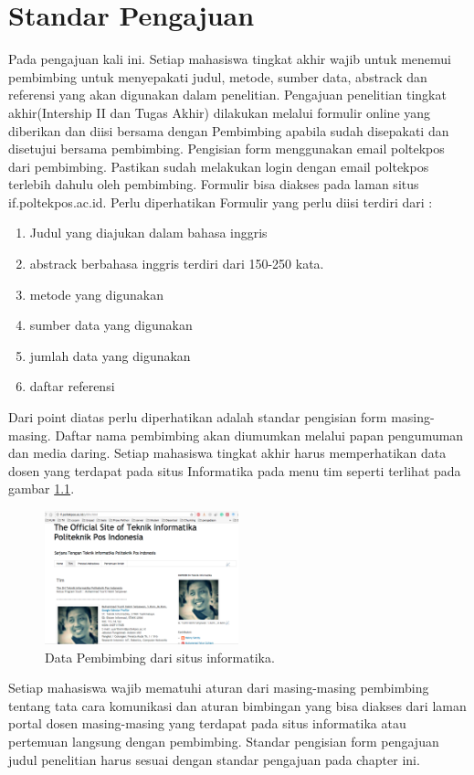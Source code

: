 \chapter{Standar Pengajuan}

Pada pengajuan kali ini. Setiap mahasiswa tingkat akhir wajib untuk menemui pembimbing untuk menyepakati judul, metode, sumber data, abstrack dan referensi yang akan digunakan dalam penelitian. Pengajuan penelitian tingkat akhir(Intership II dan Tugas Akhir) dilakukan melalui formulir online yang diberikan dan diisi bersama dengan Pembimbing apabila sudah disepakati dan disetujui bersama pembimbing. Pengisian form menggunakan email poltekpos dari pembimbing. Pastikan sudah melakukan login dengan email poltekpos terlebih dahulu oleh pembimbing. Formulir bisa diakses pada laman situs if.poltekpos.ac.id. Perlu diperhatikan Formulir yang perlu diisi terdiri dari :
\begin{enumerate}
\item Judul yang diajukan dalam bahasa inggris
\item abstrack berbahasa inggris terdiri dari 150-250 kata.
\item metode yang digunakan
\item sumber data yang digunakan
\item jumlah data yang digunakan
\item daftar referensi
\end{enumerate}
Dari point diatas perlu diperhatikan adalah standar pengisian form masing-masing. Daftar nama pembimbing akan diumumkan melalui papan pengumuman dan media daring. Setiap mahasiswa tingkat akhir harus memperhatikan data dosen yang terdapat pada situs Informatika pada menu tim seperti terlihat pada gambar \ref{figure:timif}.
\begin{figure}[ht]
	\centerline{\includegraphics[width=0.5\textwidth]{figures/timif.png}}
	\caption{Data Pembimbing dari situs informatika.}
	\label{figure:timif}
	\end{figure}
Setiap mahasiswa wajib mematuhi aturan dari masing-masing pembimbing tentang tata cara komunikasi dan aturan bimbingan yang bisa diakses dari laman portal dosen masing-masing yang terdapat pada situs informatika atau pertemuan langsung dengan pembimbing. Standar pengisian form pengajuan judul penelitian harus sesuai dengan standar pengajuan pada chapter ini.

